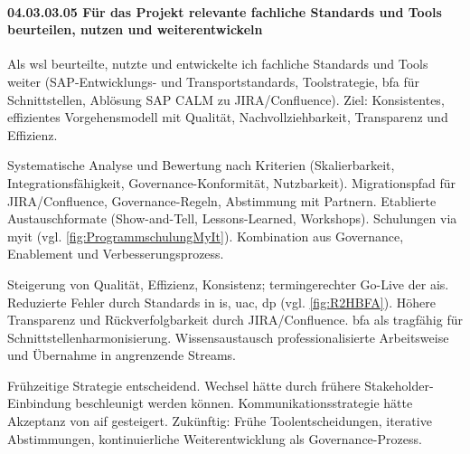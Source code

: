 \paragraph*{04.03.03.05 Für das Projekt relevante fachliche Standards und Tools beurteilen, nutzen und weiterentwickeln}
\label{para:04.03.03.05_FachlicheStandardsundTools}


\par Als \gls{wsl} beurteilte, nutzte und entwickelte ich fachliche Standards und Tools weiter (SAP-Entwicklungs- und Transportstandards, Toolstrategie, \gls{bfa} für Schnittstellen, Ablösung SAP CALM zu JIRA/Confluence). Ziel: Konsistentes, effizientes Vorgehensmodell mit Qualität, Nachvollziehbarkeit, Transparenz und Effizienz.

\par Systematische Analyse und Bewertung nach Kriterien (Skalierbarkeit, Integrationsfähigkeit, Governance-Konformität, Nutzbarkeit). Migrationspfad für JIRA/Confluence, Governance-Regeln, Abstimmung mit Partnern. Etablierte Austauschformate (Show-and-Tell, Lessons-Learned, Workshops). Schulungen via \gls{myit} (vgl. \autoref{fig:ProgrammschulungMyIt}). Kombination aus Governance, Enablement und Verbesserungsprozess.

\par Steigerung von Qualität, Effizienz, Konsistenz; termingerechter Go-Live der \gls{ais}. Reduzierte Fehler durch Standards in \gls{is}, \gls{uac}, \gls{dp} (vgl. \autoref{fig:R2HBFA}). Höhere Transparenz und Rückverfolgbarkeit durch JIRA/Confluence. \gls{bfa} als tragfähig für Schnittstellenharmonisierung. Wissensaustausch professionalisierte Arbeitsweise und Übernahme in angrenzende Streams.

\par Frühzeitige Strategie entscheidend. Wechsel hätte durch frühere Stakeholder-Einbindung beschleunigt werden können. Kommunikationsstrategie hätte Akzeptanz von \gls{aif} gesteigert. Zukünftig: Frühe Toolentscheidungen, iterative Abstimmungen, kontinuierliche Weiterentwicklung als Governance-Prozess.